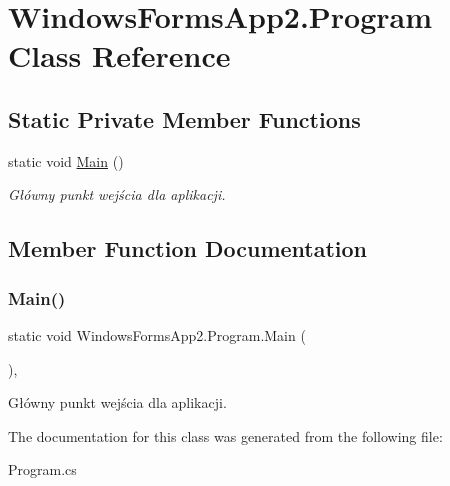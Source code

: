 \hypertarget{class_windows_forms_app2_1_1_program}{}\section{Windows\+Forms\+App2.\+Program Class Reference}
\label{class_windows_forms_app2_1_1_program}
\subsection*{Static Private Member Functions}
\begin{DoxyCompactItemize}
\item 
static void \hyperlink{class_windows_forms_app2_1_1_program_aa742224747f9ce5e02ea3099ff23c239}{Main} ()
\begin{DoxyCompactList}\small\item\em Główny punkt wejścia dla aplikacji. \end{DoxyCompactList}\end{DoxyCompactItemize}


\subsection{Member Function Documentation}
\mbox{\label{class_windows_forms_app2_1_1_program_aa742224747f9ce5e02ea3099ff23c239}} 
\subsubsection{\texorpdfstring{Main()}{Main()}}
{\footnotesize\ttfamily static void Windows\+Forms\+App2.\+Program.\+Main (\begin{DoxyParamCaption}{ }\end{DoxyParamCaption})\hspace{0.3cm}{\ttfamily [static]}, {\ttfamily [private]}}



Główny punkt wejścia dla aplikacji. 



The documentation for this class was generated from the following file\+:\begin{DoxyCompactItemize}
\item 
Program.\+cs\end{DoxyCompactItemize}
